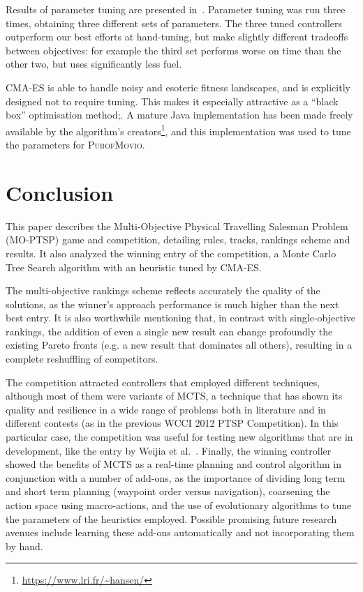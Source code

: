 \documentclass[conference]{IEEEtran}
\begin{document}
Results of parameter tuning are presented in~\cite{Powley2013_moptsp}.
Parameter tuning was run three times, obtaining three different sets of parameters.
The three tuned controllers outperform our best efforts at hand-tuning,
but make slightly different tradeoffs between objectives:
for example the third set performs worse on time than the other two, but uses significantly less fuel.

CMA-ES is able to handle noisy and esoteric fitness landscapes, and is explicitly designed not to require tuning.
This makes it especially attractive as a ``black box'' optimisation method;.
A mature Java implementation has been made freely available by the algorithm's creators\footnote{\url{https://www.lri.fr/~hansen/}},
and this implementation was used to tune the parameters for \textsc{PurofMovio}.

\section{Conclusion} \label{sec:conc}

This paper describes the Multi-Objective Physical Travelling Salesman Problem (MO-PTSP) game and competition, detailing rules, tracks, rankings scheme and results. It also analyzed the winning entry of the competition, a Monte Carlo Tree Search algorithm with an heuristic tuned by CMA-ES.  

The multi-objective rankings scheme reflects accurately the quality of the solutions, as the winner's approach performance is much higher than the next best entry. It is also worthwhile mentioning that, in contrast with single-objective rankings, the addition of even a single new result can change profoundly the existing Pareto fronts (e.g. a new result that dominates all others), resulting in a complete reshuffling of competitors.

The competition attracted controllers that employed different techniques, although most of them were variants of MCTS, a technique that has shown its quality and resilience in a wide range of problems both in literature and in different contests (as in the previous WCCI 2012 PTSP Competition). In this particular case, the competition was useful for testing new algorithms that are in development, like the entry by Weijia et al.~\cite{Wang13}. Finally, the winning controller showed the benefits of MCTS as a real-time planning and control algorithm in conjunction with a number of add-ons, as the importance of dividing long term and short term planning (waypoint order versus navigation), coarsening the action space using macro-actions, and the use of evolutionary algorithms to tune the parameters of the heuristics employed. Possible promising future research avenues include learning these add-ons automatically and not incorporating them by hand. 




\end{document}
